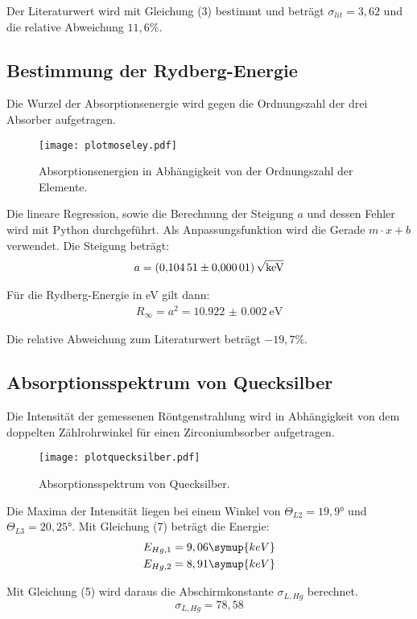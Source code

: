 Der Literaturwert wird mit Gleichung (3) bestimmt und beträgt $\sigma_{lit} = 3,62$ und die relative Abweichung $11,6\%$.


\subsection{Bestimmung der Rydberg-Energie}

Die Wurzel der Absorptionsenergie wird gegen die Ordnungszahl der drei Absorber aufgetragen.

\begin{figure}[H]
  \centering
  \texttt{[image: plotmoseley.pdf]}
  \caption{Absorptionsenergien in Abhängigkeit von der Ordnungszahl der Elemente.}
  \label{fig:plot}
\end{figure}

Die lineare Regression, sowie die Berechnung der Steigung $a$ und dessen Fehler wird mit Python durchgeführt. Als
Anpassungsfunktion wird die Gerade $m \cdot x + b$ verwendet.
Die Steigung beträgt:
\begin{align*}
  a = \SI{0.10451(1)}{\sqrt{\kilo\eV}}
\end{align*}

Für die Rydberg-Energie in eV gilt dann:
\begin{align*}
  R_{\infty} = a^2 =\SI{10.922(2)}{\eV}
\end{align*}

Die relative Abweichung zum Literaturwert beträgt $-19,7 \%$.


\subsection{Absorptionsspektrum von Quecksilber}

Die Intensität der gemessenen Röntgenstrahlung wird in Abhängigkeit von dem doppelten Zählrohrwinkel für
einen Zirconiumbsorber aufgetragen.

\begin{figure}[H]
  \centering
  \texttt{[image: plotquecksilber.pdf]}
  \caption{Absorptionsspektrum von Quecksilber.}
  \label{fig:plot}
\end{figure}


Die Maxima der Intensität liegen bei einem Winkel von $\Theta_{L2} = 19,9°$  und $\Theta_{L3} = 20,25°$.
Mit Gleichung (7) beträgt die Energie:
\begin{align*}
  E_{Hg,1} = 9,06 \symup{keV} \\
  E_{Hg,2} = 8,91 \symup{keV}
\end{align*}

Mit Gleichung (5) wird daraus die Abschirmkonstante $\sigma_{L, Hg}$ berechnet.
\begin{equation*}
  \sigma_{L, Hg} = 78,58
\end{equation*}
